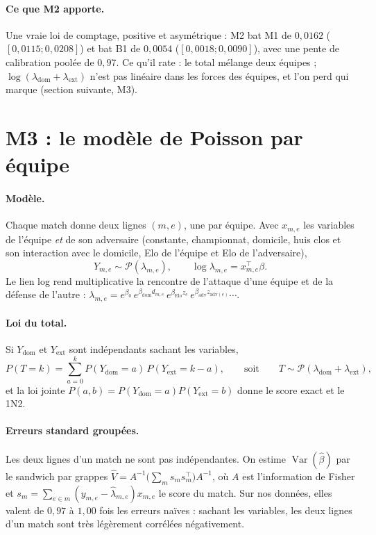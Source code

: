 \paragraph{Ce que M2 apporte.} Une vraie loi de comptage, positive et asymétrique : M2 bat M1 de
\(0{,}0162\) (\([0{,}0115 ; 0{,}0208]\)) et bat B1 de \(0{,}0054\) (\([0{,}0018 ; 0{,}0090]\)),
avec une pente de calibration poolée de \(0{,}97\). Ce qu'il rate : le total mélange deux équipes ;
\(\log(\lambda_{\mathrm{dom}} + \lambda_{\mathrm{ext}})\) n'est pas linéaire dans les forces des
équipes, et l'on perd \og qui marque \fg{} (section suivante, M3).

\section{M3 : le modèle de Poisson par équipe}
\label{sec:m3}

\paragraph{Modèle.} Chaque match donne deux lignes \((m, e)\), une par équipe. Avec \(x_{m,e}\) les
variables de l'équipe \emph{et} de son adversaire (constante, championnat, domicile, huis clos et son
interaction avec le domicile, Elo de l'équipe et Elo de l'adversaire),
\[
  Y_{m,e} \sim \mathcal{P}(\lambda_{m,e}),
  \qquad
  \log \lambda_{m,e} = x_{m,e}^\top \beta .
\]
Le lien log rend multiplicative la rencontre de l'attaque d'une équipe et de la défense de
l'autre : \(\lambda_{m,e} = e^{\beta_0}\, e^{\beta_{\mathrm{dom}} d_{m,e}}\, e^{\beta_{\mathrm{Elo}} z_e}\,
e^{\beta_{\mathrm{adv}} z_{\mathrm{adv}(e)}} \cdots\).

\paragraph{Loi du total.} Si \(Y_{\mathrm{dom}}\) et \(Y_{\mathrm{ext}}\) sont indépendants sachant
les variables,
\[
  P(T = k) = \sum_{a=0}^{k} P(Y_{\mathrm{dom}} = a)\, P(Y_{\mathrm{ext}} = k - a),
  \qquad\text{soit}\qquad T \sim \mathcal{P}(\lambda_{\mathrm{dom}} + \lambda_{\mathrm{ext}}),
\]
et la loi jointe \(P(a, b) = P(Y_{\mathrm{dom}} = a) P(Y_{\mathrm{ext}} = b)\) donne le score exact
et le 1N2.

\paragraph{Erreurs standard groupées.} Les deux lignes d'un match ne sont pas indépendantes. On
estime \(\operatorname{Var}(\hat\beta)\) par le sandwich par grappes
\(\hat V = A^{-1} \big(\sum_{m} s_m s_m^\top\big) A^{-1}\), où \(A\) est l'information de Fisher et
\(s_m = \sum_{e \in m} (y_{m,e} - \hat\lambda_{m,e}) x_{m,e}\) le score du match. Sur nos données,
elles valent de \(0{,}97\) à \(1{,}00\) fois les erreurs \og naïves \fg{} : sachant les variables,
les deux lignes d'un match sont très légèrement corrélées négativement.

